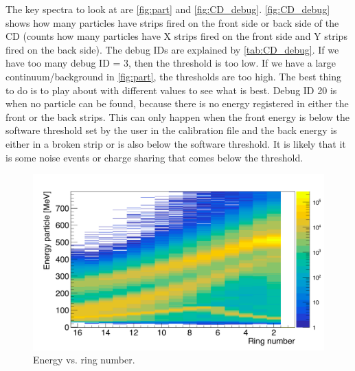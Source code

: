 \documentclass[twoside,english]{uiofysmaster/uiofysmaster}
\begin{document}
The key spectra to look at are \autoref{fig:part} and \autoref{fig:CD_debug}. 
\autoref{fig:CD_debug} shows how many particles have strips fired on the front side or back side of the CD (counts how many particles have X strips fired on the front side and Y strips fired on the back side). 
The debug IDs are explained by \autoref{tab:CD_debug}. 
If we have too many debug ID = 3, then the threshold is too low. If we have a large continuum/background in \autoref{fig:part}, the thresholds are too high. The best thing to do is to play about with different values to see what is best.
Debug ID 20 is when no particle can be found, because there is no energy registered in either the front or the back strips. 
This can only happen when the front energy is below the software threshold set by the user in the calibration file and the back energy is either in a broken strip or is also below the software threshold. 
It is likely that it is some noise events or charge sharing that comes below the threshold. 



\begin{figure}[ht]
	\centering
	\includegraphics[width=\textwidth]{../Plots/plotting/E_vs_ring_all.png}
	\caption{Energy vs. ring number.}
	\label{fig:part}
\end{figure}


\end{document}
